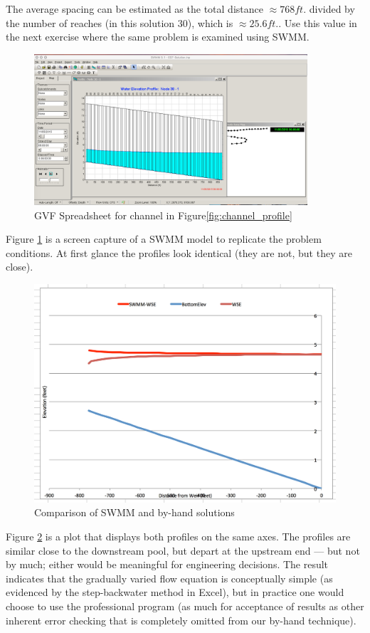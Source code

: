 \documentclass[12pt]{article}
\begin{document}
\begin{enumerate}
The average spacing can be estimated as the total distance $\approx 768 ft.$ divided by the number of reaches (in this solution 30), which is $\approx 25.6 ft.$.   Use this value in the next exercise where the same problem is examined using SWMM. 


\begin{figure}[htbp] %
   \centering
   \includegraphics[width=4in]{SWMM-WSP.jpg} 
   \caption{GVF Spreadsheet for channel in Figure\ref{fig:channel_profile}}
   \label{fig:SWMM-WSP}
\end{figure}

Figure \ref{fig:SWMM-WSP} is a screen capture of a SWMM model to replicate the problem conditions. 
At first glance the profiles look identical (they are not, but they are close).

\begin{figure}[htbp] %
   \centering
   \includegraphics[width=5in]{SWMM-WSP2.jpg} 
   \caption{Comparison of SWMM and by-hand solutions}
   \label{fig:SWMM-WSP2}
\end{figure}

Figure \ref{fig:SWMM-WSP2} is a plot that displays both profiles on the same axes.  
The profiles are similar close to the downstream pool, but depart at the upstream end --- but not by much; either would be meaningful for engineering decisions.  
The result indicates that the gradually varied flow equation is conceptually simple (as evidenced by the step-backwater method in Excel), but in practice one would choose to use the professional program (as much for acceptance of results as other inherent error checking that is completely omitted from our by-hand technique).
\end{enumerate}
\end{document}
